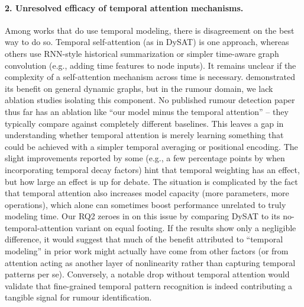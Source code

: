 \documentclass{cshonours}
\begin{document}
\paragraph{2. Unresolved efficacy of temporal attention mechanisms.} Among works that do use temporal modeling, there is disagreement on the best way to do so. Temporal self-attention (as in DySAT) is one approach, whereas others use RNN-style historical summarization or simpler time-aware graph convolution (e.g., adding time features to node inputs). It remains unclear if the complexity of a self-attention mechanism across time is necessary. \cite{sankar2020dysat} demonstrated its benefit on general dynamic graphs, but in the rumour domain, we lack ablation studies isolating this component. No published rumour detection paper thus far has an ablation like “our model minus the temporal attention” – they typically compare against completely different baselines. This leaves a gap in understanding whether temporal attention is merely learning something that could be achieved with a simpler temporal averaging or positional encoding. The slight improvements reported by some (e.g., a few percentage points by \cite{zhou2021early} when incorporating temporal decay factors) hint that temporal weighting has an effect, but how large an effect is up for debate. The situation is complicated by the fact that temporal attention also increases model capacity (more parameters, more operations), which alone can sometimes boost performance unrelated to truly modeling time. Our RQ2 zeroes in on this issue by comparing DySAT to its no-temporal-attention variant on equal footing. If the results show only a negligible difference, it would suggest that much of the benefit attributed to “temporal modeling” in prior work might actually have come from other factors (or from attention acting as another layer of nonlinearity rather than capturing temporal patterns per se). Conversely, a notable drop without temporal attention would validate that fine-grained temporal pattern recognition is indeed contributing a tangible signal for rumour identification.
\end{document}
